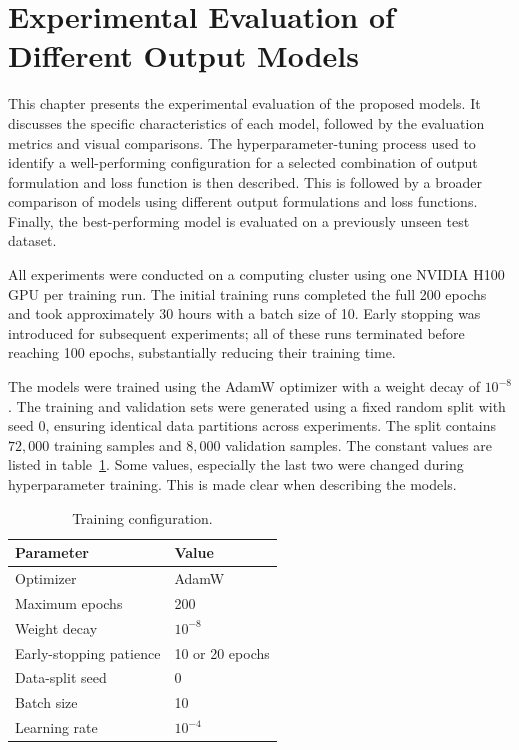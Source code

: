 \section{Experimental Evaluation of Different Output Models}
\label{sec:experiments}

This chapter presents the experimental evaluation of the proposed models. It discusses the specific characteristics of each model, followed by the evaluation metrics and visual comparisons. The hyperparameter-tuning process used to identify a well-performing configuration for a selected combination of output formulation and loss function is then described. This is followed by a broader comparison of models using different output formulations and loss functions. Finally, the best-performing model is evaluated on a previously unseen test dataset.

All experiments were conducted on a computing cluster using one NVIDIA H100 GPU per training run. The initial training runs completed the full 200 epochs and took approximately 30 hours with a batch size of 10. Early stopping was introduced for subsequent experiments; all of these runs terminated before reaching 100 epochs, substantially reducing their training time.

The models were trained using the AdamW optimizer with a weight decay of \(10^{-8}\). The training and validation sets were generated using a fixed random split with seed 0, ensuring identical data partitions across experiments. The split contains $72{,}000$ training samples and $8{,}000$ validation samples. The constant values are listed in table~\ref{tab:training_configuration}. Some values, especially the last two were changed during hyperparameter training. This is made clear when describing the models. 

\begin{table}[htbp]
\centering
\caption{Training configuration.}
\label{tab:training_configuration}
\begin{tabular}{ll}
\toprule
Parameter & Value \\
\midrule
Optimizer & AdamW \\
Maximum epochs & 200 \\
Weight decay & \(10^{-8}\) \\
Early-stopping patience & 10 or 20 epochs \\
Data-split seed & 0 \\
Batch size & 10 \\
Learning rate & \(10^{-4}\) \\
\bottomrule
\end{tabular}
\end{table}

